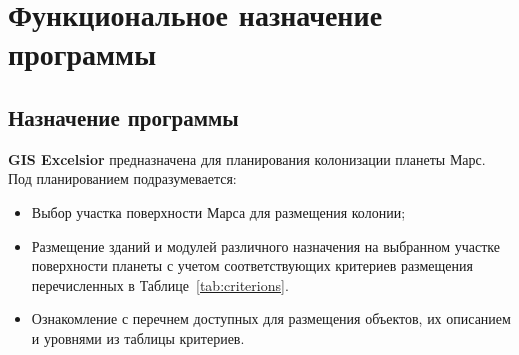 
\section{Функциональное назначение программы}

\subsection{Назначение программы}

%
\textbf{GIS Excelsior} предназначена для планирования колонизации планеты Марс. Под планированием подразумевается:

\begin{itemize}
	\item Выбор участка поверхности Марса для размещения колонии;
	\item Размещение зданий и модулей различного назначения на выбранном участке поверхности планеты с учетом соответствующих критериев размещения перечисленных в Таблице~\ref{tab:criterions}.
	\item Ознакомление с перечнем доступных для размещения объектов, их описанием и уровнями из таблицы критериев.
\end{itemize}
%




%

%
